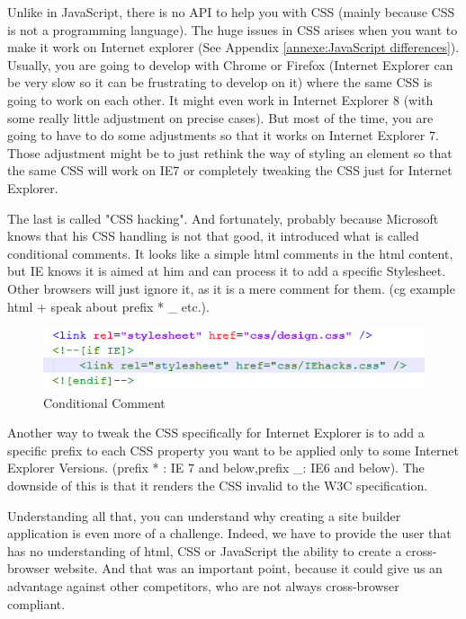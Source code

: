 Unlike in JavaScript, there is no API to help you with CSS (mainly because CSS is not a programming language). The huge issues in CSS arises when you want to make it work on Internet explorer (See Appendix \ref{annexe:JavaScript differences}). Usually, you are going to develop with Chrome or Firefox (Internet Explorer can be very slow so it can be frustrating to develop on it) where the same CSS is going to work on each other. It might even work in Internet Explorer 8 (with some really little adjustment on precise cases). But most of the time, you are going to have to do some adjustments so that it works on Internet Explorer 7. Those adjustment might be to just rethink the way of styling an element so that the same CSS will work on IE7 or completely tweaking the CSS just for Internet Explorer.

The last is called "CSS hacking". And fortunately, probably because Microsoft knows that his CSS handling is not that good, it introduced what is called conditional comments. It looks like a simple html comments in the html content, but IE knows it is aimed at him and can process it to add a specific Stylesheet. Other browsers will just ignore it, as it is a mere comment for them. (cg example html + speak about prefix * \_ etc.). 

\begin{figure}[!ht]
\centering
\includegraphics[width=.55\textwidth]{img/comments.png}
\caption{Conditional Comment}
\label{figure:conditional comment}
\end{figure}

Another way to tweak the CSS specifically for Internet Explorer is to add a specific prefix to each CSS property you want to be applied only to some Internet Explorer Versions. (prefix * : IE 7 and below,prefix \_: IE6 and below). The downside of this is that it renders the CSS invalid to the W3C specification.

Understanding all that, you can understand why creating a site builder application is even more of a challenge. Indeed, we have to provide the user that has no understanding of html, CSS or JavaScript the ability to create a cross-browser website. And that was an important point, because it could give us an advantage against other competitors, who are not always cross-browser compliant.
